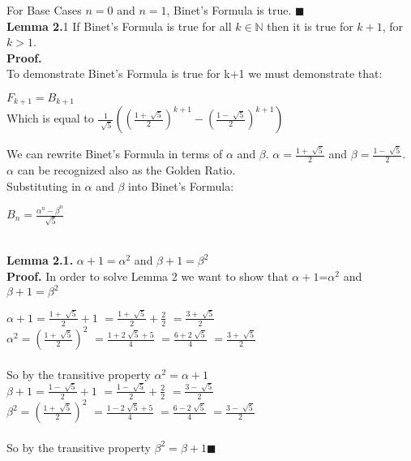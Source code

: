\documentclass{article}
\begin{document}
	For Base Cases $n=0$ and $n=1$, Binet's Formula is true.  
$\blacksquare$\\
{\bf Lemma 2.}1
If Binet's Formula is true for all $k \in {\mathbb N}$ then it is true for $k+1$, for $k>1$.
\\
{\bf Proof.}
\\
To demonstrate Binet's Formula is true for k+1 we must demonstrate that:
\begin{center}
	$F_{k+1}=B_{k+1}$
	\\
	Which is equal to $\frac{1}{\sqrt[]{5}}((\frac{1+\sqrt[]{5}}{2})^{k+1}-(\frac{1-\sqrt[]{5}}{2})^{k+1})$
\end{center}
We can rewrite Binet's Formula in terms of $\alpha$ and $\beta$.  $\alpha = \frac{1+\sqrt[]{5}}{2}$ and $\beta = \frac{1-\sqrt[]{5}}{2}$. $\alpha$ can be recognized also as the Golden Ratio.   \\
Substituting in $\alpha$ and $\beta$ into Binet's Formula: \begin{center}$B_n=\frac{\alpha^n - \beta^n}{\sqrt[]{5}}$\end{center}
~\\
{\bf Lemma 2.1.} $\alpha+1 = \alpha^{2}$ and $\beta+1=\beta^{2}$ 
\\
{\bf Proof.}
In order to solve Lemma 2 we want to show that $\alpha+1$=$\alpha^2$ and $\beta+1=\beta^{2}$
\begin{center}
	$\alpha+1= \frac{1+\sqrt[]{5}}{2}+1$
	$=\frac{1+\sqrt[]{5}}{2}+\frac{2}{2}$
	$=\frac{3+\sqrt[]{5}}{2}$
	\\
	$\alpha^{2} = (\frac{1+\sqrt[]{5}}{2})^{2}$
	$=\frac{1+2\sqrt[]{5}+5}{4}$
	$=\frac{6+2\sqrt[]{5}}{4}$
	$=\frac{3+\sqrt[]{5}}{2}$
	\\
	~\\
	So by the transitive property $\alpha^2 = \alpha+1$
	~\\
	$\beta+1 = \frac{1-\sqrt[]{5}}{2}+1$
	$=\frac{1-\sqrt[]{5}}{2}+\frac{2}{2}$
	$=\frac{3-\sqrt[]{5}}{2}$
	\\
	$\beta^{2} = (\frac{1+\sqrt[]{5}}{2})^{2}$
	$=\frac{1-2\sqrt[]{5}+5}{4}$
	$=\frac{6-2\sqrt[]{5}}{4}$
	$=\frac{3-\sqrt[]{5}}{2}$
	\\
	~\\
	So by the transitive property $\beta^2 = \beta+1$$\blacksquare$

\end{center}
\end{document}
